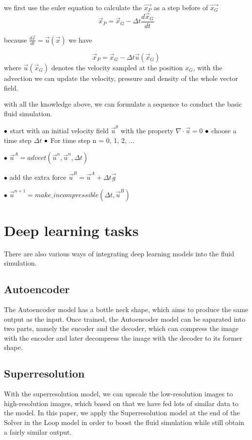 \documentclass[a4paper,12pt,twoside]{report}
\begin{document}
we first use the euler equation to calculate the $\vec{x_P}$ as a step before of $\vec{x_G}$
\begin{equation}
\vec x_P=\vec x_G-\Delta t\frac{d\vec x_G}{dt}
\end{equation}

because $\frac{d\vec x}{dt}=\vec u(\vec x)$ we have

\begin{equation}
\vec x_P=\vec x_G-\Delta t\vec u(\vec x_G)
\end{equation}
where $\vec u(\vec x_G)$ denotes the velocity sampled at the position $x_G$, with the advection we can update the velocity, pressure and density of the whole vector field.

with all the knowledge above, we can formulate a sequence to conduct the basic fluid simulation.

$\\\bullet$ start with an initial velocity field $\vec{u}^{0}$ with the property ${\nabla}\cdot\vec{u} = 0$
$\\\bullet$ choose a time step $\Delta t$ 
$\\\bullet$ For time step n = 0, 1, 2, ...
\par$\bullet$  $\vec{u}^{A} = advect(\vec{u}^{n}, \vec{u}^{n}, \Delta t)$
 \par$\bullet$  add the extra force $\vec{u}^{B} = \vec{u}^{A} + \Delta t\vec{g}$
 \par$\bullet$  $\vec{u}^{n+1} =make\_incompressible(\Delta t, \vec{u}^{B})$


\section{Deep learning tasks}
There are also various ways of integrating deep learning models into the fluid simulation.
\subsection{Autoencoder}
The Autoencoder model has a bottle neck shape, which aims to produce the same output as the input. Once trained, the Autoencoder model can be saparated into two parts, namely the encoder and the decoder, which can compress the image with the encoder and later decompress the image with the decoder to its former shape.
\subsection{Superresolution}
With the superresolution model, we can upscale the low-resolution images to high-resolution images, which based on that we have fed lots of similar data to the model. In this paper, we apply the Superresolution model at the end of the Solver in the Loop model in order to boost the fluid simulation while still obtain a fairly similar output.
\end{document}
